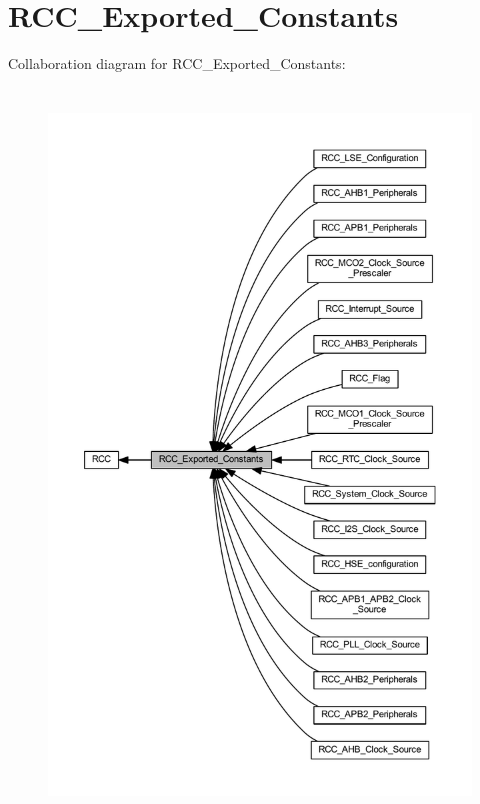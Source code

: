 \hypertarget{group___r_c_c___exported___constants}{}\section{R\+C\+C\+\_\+\+Exported\+\_\+\+Constants}
\label{group___r_c_c___exported___constants}
Collaboration diagram for R\+C\+C\+\_\+\+Exported\+\_\+\+Constants\+:\nopagebreak
\begin{figure}[H]
\begin{center}
\leavevmode
\includegraphics[height=550pt]{group___r_c_c___exported___constants}
\end{center}
\end{figure}
